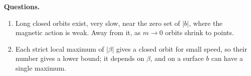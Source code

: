 \medskip\noindent
{\bf Questions.}
\begin{enumerate}
\item Long closed orbits exist, very slow,
near the zero set of $|b|$, where the
magnetic action is weak. Away from it, as
$m \to 0$ orbits shrink to points.
\item Each strict local maximum of $|\beta|$
gives a closed orbit for small speed, so
their number gives a lower bound; it
depends on $\beta$, and on a surface $b$ can
have a single maximum.
\end{enumerate}





